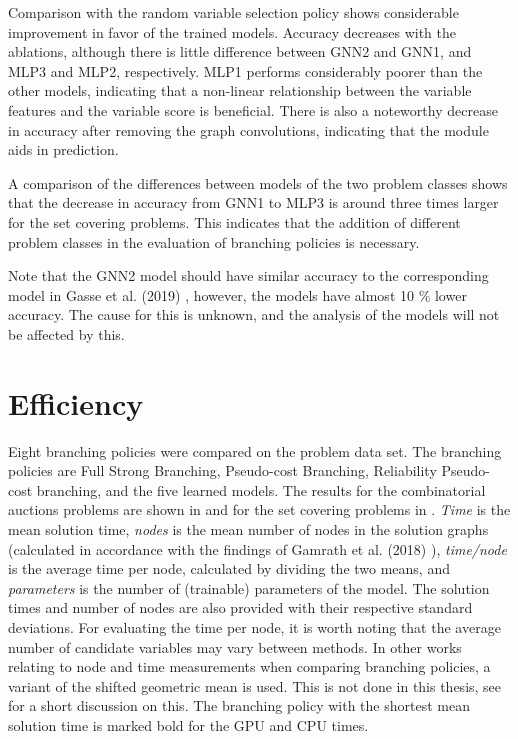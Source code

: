 Comparison with the random variable selection policy shows considerable improvement in favor of the trained models. Accuracy decreases with the ablations, although there is little difference between GNN2 and GNN1, and MLP3 and MLP2, respectively. MLP1 performs considerably poorer than the other models, indicating that a non-linear relationship between the variable features and the variable score is beneficial. There is also a noteworthy decrease in accuracy after removing the graph convolutions, indicating that the module aids in prediction.

A comparison of the differences between models of the two problem classes shows that the decrease in accuracy from GNN1 to MLP3 is around three times larger for the set covering problems. This indicates that the addition of different problem classes in the evaluation of branching policies is necessary.

Note that the GNN2 model should have similar accuracy to the corresponding model in Gasse et al. (2019) \cite{gasse2019exact}, however, the models have almost 10 \% lower accuracy. The cause for this is unknown, and the analysis of the models will not be affected by this. 



\section{Efficiency}\label{sec:res_efficiency}

Eight branching policies were compared on the problem data set. The branching policies are Full Strong Branching, Pseudo-cost Branching, Reliability Pseudo-cost branching, and the five learned models. The results for the combinatorial auctions problems are shown in  and for the set covering problems in . \textit{Time} is the mean solution time, \textit{nodes} is the mean number of nodes in the solution graphs (calculated in accordance with the findings of Gamrath et al. (2018) \cite{gamrath2018measuring}), \textit{time/node} is the average time per node, calculated by dividing the two means, and \textit{parameters} is the number of (trainable) parameters of the model. The solution times and number of nodes are also provided with their respective standard deviations. For evaluating the time per node, it is worth noting that the average number of candidate variables may vary between methods. In other works relating to node and time measurements when comparing branching policies, a variant of the shifted geometric mean is used. This is not done in this thesis, see  for a short discussion on this. 
The branching policy with the shortest mean solution time is marked bold for the \gls{GPU} and \gls{CPU} times. 

